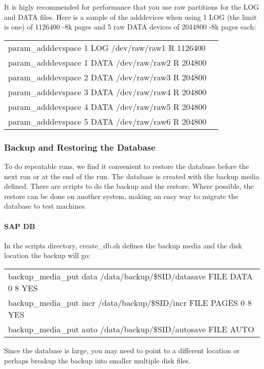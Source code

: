 \documentclass{article}
\begin{document}
It is higly recommended for performance that you use raw partitions for the
LOG and DATA files.  Here is a sample of the adddevices when using 1 LOG (the
limit is one)  of 1126400 -8k pages and 5 raw DATA devices of 2044800 -8k
pages each: \\
\begin{tabular}[c]{ll}
param\_adddevspace 1 LOG  /dev/raw/raw1 R 1126400 \\
param\_adddevspace 1 DATA /dev/raw/raw2 R 204800 \\
param\_adddevspace 2 DATA /dev/raw/raw3 R 204800 \\
param\_adddevspace 3 DATA /dev/raw/raw4 R 204800 \\
param\_adddevspace 4 DATA /dev/raw/raw5 R 204800 \\
param\_adddevspace 5 DATA /dev/raw/raw6 R 204800 \\
\end{tabular}

\subsubsection{Backup and Restoring the Database}

To do repeatable runs, we find it convenient to restore the database before
the next run or at the end of the run.  The database is created with the
backup media defined.  There are scripts to do the backup and the restore.
Where possible, the restore can be done on another system, making an easy way
to migrate the database to test machines.

\paragraph{SAP DB}

In the scripts directory, create\_db.sh defines the backup media and the disk
location the backup will go: \\
\begin{tabular}[c]{l}
backup\_media\_put data /data/backup/\$SID/datasave FILE DATA 0 8 YES \\
backup\_media\_put incr /data/backup/\$SID/incr FILE PAGES 0 8 YES \\
backup\_media\_put auto /data/backup/\$SID/autosave FILE AUTO \\
\end{tabular}

Since the database is large, you may need to point to a different location or
perhaps breakup the backup into smaller multiple disk files. 
\end{document}
